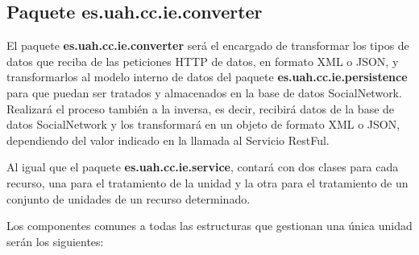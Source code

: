 \subsection{Paquete es.uah.cc.ie.converter}
El paquete \textbf{es.uah.cc.ie.converter} será el encargado de transformar los tipos de datos que reciba de las peticiones HTTP de datos, en formato XML o JSON, y transformarlos al modelo interno de datos del paquete \textbf{es.uah.cc.ie.persistence} para que puedan ser tratados y almacenados en la base de datos SocialNetwork. Realizará el proceso también a la inversa, es decir, recibirá datos de la base de datos SocialNetwork y los transformará en un objeto de formato XML o JSON, dependiendo del valor indicado en la llamada al Servicio RestFul.
\bigskip
\par
Al igual que el paquete \textbf{es.uah.cc.ie.service}, contará con dos clases para cada recurso, una para el tratamiento de la unidad y la otra para el tratamiento de un conjunto de unidades de un recurso determinado.
\bigskip
\par
Los componentes comunes a todas las estructuras que gestionan una única unidad serán los siguientes:
